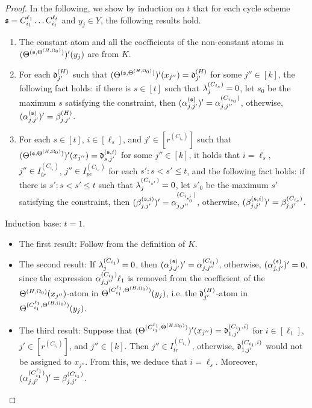 \begin{appendix}
\begin{proof}
In the following, we show by induction on $t$ that for each cycle scheme ${\mathfrak{s} }=C^{\ell_1}_{i_1} \dots C^{\ell_t}_{i_t}$ and $y_j \in Y$, the following results hold.
\begin{enumerate}
\item The constant atom and all the coefficients of the non-constant atoms in $(\Theta^{({\mathfrak{s} }, \Theta^{(H,\Omega_0)})})'(y_j)$ are from $K$.
%
\item For each $\mathfrak{d}^{(H)}_{j'}$ such that $(\Theta^{({\mathfrak{s} },\Theta^{(H,\Omega_0)})})'(x_{j''})=\mathfrak{d}^{(H)}_{j'}$ for some $j''  \in [k]$, the following fact holds: if there is $s \in [t]$ such that $\lambda^{(C_{i_s})}_j =0$, let $s_0$ be the maximum $s$ satisfying the constraint, then $(\alpha^{({\mathfrak{s} })}_{j,j'})'=\alpha^{(C_{i_{s_0}})}_{j, j''}$, otherwise, $(\alpha^{({\mathfrak{s} })}_{j,j'})'= \beta^{(H)}_{j,j'}$.
%
\item For each $s \in [t]$, $i \in [\ell_s]$, and $j' \in [r^{(C_{i_s})}]$ such that $(\Theta^{({\mathfrak{s} },\Theta^{(H,\Omega_0)})})'(x_{j''})=\mathfrak{d}^{({\mathfrak{s} }, i)}_{s, j'}$ for some $j''  \in [k]$, it holds that $i = \ell_s$, $j'' \in I^{(C_{i_s})}_{tr}$, $j'' \in I^{(C_{i_{s'}})}_{pe}$ for each $s': s < s' \le t$, and the following fact holds: if there is $s': s < s' \le t$ such that $\lambda^{(C_{i_{s'}})}_j =0$, let $s'_0$ be the maximum $s'$ satisfying the constraint, then $(\beta^{({\mathfrak{s} }, i)}_{j,j'})'=\alpha^{(C_{i_{s'_0}})}_{j, j''}$, otherwise, $(\beta^{({\mathfrak{s} }, i)}_{j,j'})'= \beta^{(C_{i_s})}_{j,j'}$. 
\end{enumerate}



Induction base: $t=1$. 
\begin{itemize}
\item The first result: Follow from the definition of $K$. 

\item The second result: If $\lambda^{(C_{i_1})}_j = 0$, then $(\alpha^{({\mathfrak{s} })}_{j,j'})'=\alpha^{(C_{i_{1}})}_{j, j''}$,  otherwise, $(\alpha^{({\mathfrak{s} })}_{j,j'})'=0$, since the expression $\alpha^{(C_{i_1})}_{j,j''} \ell_1$ is removed from the coefficient of the $\Theta^{(H,\Omega_0)}(x_{j''})$-atom in $\Theta^{(C^{\ell_1}_{i_1},\Theta^{(H,\Omega_0)})}(y_j)$, i.e. the $\mathfrak{d}^{(H)}_{j'}$-atom in $\Theta^{(C^{\ell_1}_{i_1},\Theta^{(H,\Omega_0)})}(y_j)$. 

\item The third result: Suppose that $(\Theta^{(C^{\ell_1}_{i_1},\Theta^{(H,\Omega_0)})})'(x_{j''})=\mathfrak{d}^{(C_{i_1}, i)}_{1, j'}$ for $i \in [\ell_1]$, $j' \in [r^{(C_{i_1})}]$, and $j'' \in [k]$. Then $j'' \in I^{(C_{i_1})}_{tr}$, otherwise, $\mathfrak{d}^{(C_{i_1}, i)}_{1, j'}$ would not be assigned to $x_{j''}$. From this, we deduce that $i = \ell_s$. Moreover, $(\alpha^{(C^{\ell_1}_{i_1})}_{j,j'})'= \beta^{(C_{i_1})}_{j,j'}$. 
\end{itemize}


\end{proof}
\end{appendix}
